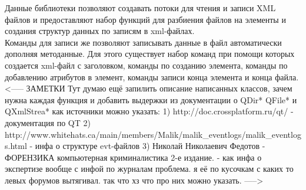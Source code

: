 Данные библиотеки позволяют создавать потоки для чтения и записи XML файлов и предоставляют набор функций для разбиения файлов на элементы и создания структур данных по записям в xml-файлах. \\

Команды для записи же позволяют записывать данные в файл автоматически дополняя методанные. Для этого существует набор команд при помощи которых создается xml-файл с заголовком, команды по созданию элемента, команды по добавлению атрибутов в элемент, команды записи конца элемента и конца файла. \\

<-----
ЗАМЕТКИ
Тут думаю ещё запилить описание написанных классов, зачем нужна каждая функция и добавить выдержки из документации о QDir* QFile* и QXmlStrea*
как источники можно указать:
1) http://doc.crossplatform.ru/qt/ - документация по QT
2) http://www.whitehats.ca/main/members/Malik/malik_eventlogs/malik_eventlogs.html - инфа о структуре evt-файлов
3) Николай Николаевич Федотов - ФОРЕНЗИКА компьютерная криминалистика 2-е издание. - как инфа о экспертизе вообще
с инфой по журналам проблема. я её по кусочкам с каких то левых форумов вытягивал. так что хз что про них можно указать.
----->
